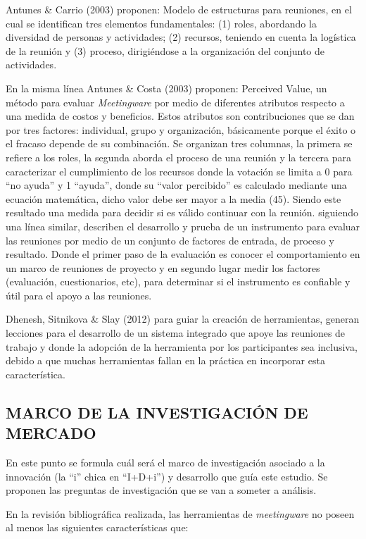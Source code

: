 Antunes \& Carrio (2003) proponen: Modelo de estructuras para reuniones, en el cual se identifican tres elementos fundamentales: (1) roles, abordando la diversidad de personas y actividades; (2) recursos, teniendo en cuenta la logística de la reunión y (3) proceso, dirigiéndose a la organización del conjunto de actividades.

En la misma línea Antunes \& Costa (2003) proponen: Perceived Value, un método para evaluar \textit{Meetingware} por medio de diferentes atributos respecto a una medida de costos y beneficios. Estos atributos son contribuciones que se dan por tres factores: individual, grupo y organización, básicamente porque el éxito o el fracaso depende de su combinación. Se organizan tres columnas, la primera se refiere a los roles, la segunda aborda el proceso de una reunión y la tercera para caracterizar el cumplimiento de los recursos donde la votación se limita a 0 para “no ayuda” y 1 “ayuda”, donde su “valor percibido” es calculado mediante una ecuación matemática, dicho valor debe ser mayor a la media (45). Siendo este resultado una medida para decidir si es válido continuar con la reunión.  siguiendo una línea similar, describen el desarrollo y prueba de un instrumento para evaluar las reuniones por medio de un conjunto de factores de entrada, de proceso y resultado. Donde el primer paso de la evaluación es conocer el comportamiento en un marco de reuniones de proyecto y en segundo lugar medir los factores (evaluación, cuestionarios, etc), para determinar si el instrumento es confiable y útil para el apoyo a las reuniones.

Dhenesh, Sitnikova \& Slay (2012) para guiar la creación de herramientas, generan lecciones para el desarrollo de un sistema integrado que apoye las reuniones de trabajo y donde la adopción de la herramienta por los participantes sea inclusiva, debido a que muchas herramientas fallan en la práctica en incorporar esta característica.

\subsection{MARCO DE LA INVESTIGACIÓN DE MERCADO}

En este punto se formula cuál será el marco de investigación asociado a la innovación (la “i” chica en “I+D+i”) y desarrollo que guía este estudio. Se proponen las preguntas de investigación que se van a someter a análisis.

En la revisión bibliográfica realizada, las herramientas de \textit{meetingware} no poseen al menos las siguientes características que:


